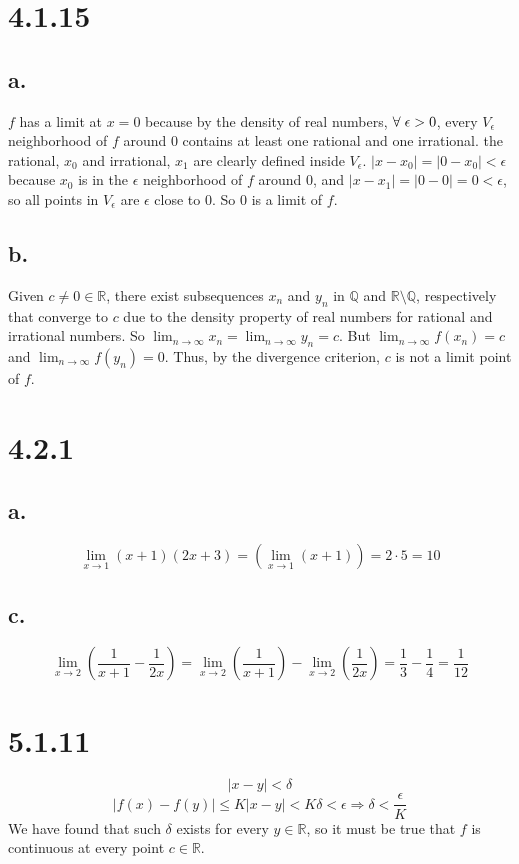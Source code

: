 \documentclass[11pt]{article}
\begin{document}
\section*{4.1.15}
\subsection*{a.}
$f$ has a limit at $x=0$ because by the density of real numbers, $\forall \hspace{1mm}\epsilon>0$, every $V_{\epsilon}$ neighborhood of $f$ around 0 contains at least one rational and one irrational. the rational, $x_0$ and irrational, $x_1$ are clearly defined inside $V_{\epsilon}$. $|x-x_0| = |0-x_0|< \epsilon$ because $x_0$ is in the $\epsilon$ neighborhood of $f$ around 0, and $|x-x_1|=|0-0|=0 < \epsilon$, so all points in $V_{\epsilon}$ are $\epsilon$ close to 0. So 0 is a limit of $f$.

\subsection*{b.}
Given $c\neq0 \in\mathbb{R}$, there exist subsequences $x_n$ and $y_n$ in $\mathbb{Q}$ and $\mathbb{R}\setminus\mathbb{Q}$, respectively that converge to $c$ due to the density property of real numbers for rational and irrational numbers. So $\lim_{n\to\infty}x_n=\lim_{n\to\infty}y_n=c$. But $\lim_{n\to\infty}f(x_n)=c$ and $\lim_{n\to\infty}f(y_n)=0$. Thus, by the divergence criterion, $c$ is not a limit point of $f$.

\section*{4.2.1}
\subsection*{a.}
\[\lim_{x\to1}(x+1)(2x+3)=\left(\lim_{x\to1}(x+1)\right)=2\cdot 5 = 10\]

\subsection*{c.}
\[\lim_{x\to2}\left(\frac{1}{x+1}-\frac{1}{2x}\right)=\lim_{x\to2}\left(\frac{1}{x+1}\right)-\lim_{x\to2}\left(\frac{1}{2x}\right)=\frac{1}{3}-\frac{1}{4}=\frac{1}{12}\]

\section*{5.1.11}
\[|x-y| < \delta\]
\[|f(x)-f(y)|\leq K|x-y| < K\delta < \epsilon \Rightarrow \delta < \frac{\epsilon}{K}\]
We have found that such $\delta$ exists for every $y\in\mathbb{R}$, so it must be true that $f$ is continuous at every point $c \in\mathbb{R}$.
\end{document}
